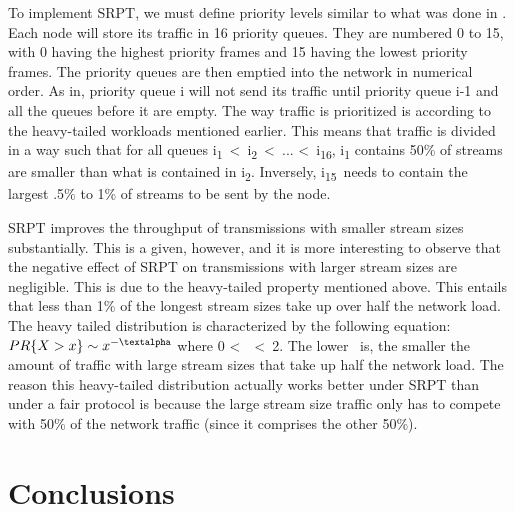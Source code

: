 \documentclass{sigcomm-alternate}
\begin{document}
To implement SRPT, we must define priority levels similar to what was done in \cite{Unfair}. Each node will store its traffic in 16 priority queues. They are numbered 0 to 15, with 0 having the highest priority frames and 15 having the lowest priority frames. The priority queues are then emptied into the network in numerical order. As in, priority queue i will not send its traffic until priority queue i-1 and all the queues before it are empty. The way traffic is prioritized is according to the heavy-tailed workloads mentioned earlier. This means that traffic is divided in a way such that for all queues i\textsubscript{1}\ \textless \ i\textsubscript{2}\ \textless \  ... \textless \  i\textsubscript{16}, i\textsubscript{1} contains 50\% of streams are smaller than what is contained in i\textsubscript{2}. Inversely, i\textsubscript{15}\ needs to contain the largest .5\% to 1\% of streams to be sent by the node. 

SRPT improves the throughput of transmissions with smaller stream sizes substantially. This is a given, however, and it is more interesting to observe that the negative effect of SRPT on transmissions with larger stream sizes are negligible. This is due to the heavy-tailed property mentioned above. This entails that less than 1\% of the longest stream sizes take up over half the network load. The heavy tailed distribution is characterized by the following equation: \(PR\{X > x \}\sim x^{-\textalpha}\) where 0 \textless \ \textalpha  \ \textless \ 2. The lower \textalpha \ is, the smaller the amount of traffic with large stream sizes that take up half the network load. The reason this heavy-tailed distribution actually works better under SRPT than under a fair protocol is because the large stream size traffic only has to compete with 50\% of the network traffic (since it comprises the other 50\%). 


\section{Conclusions}
\label{section:conclusions}

 
\end{document}
